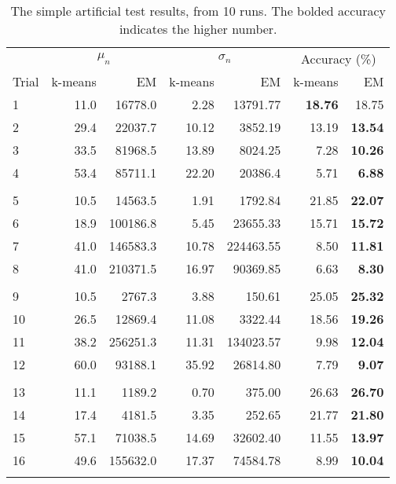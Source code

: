 \documentclass{journal}
\begin{document}
\begin{table}[hp]
\centering{}
\caption{The simple artificial test results, from 10 runs. The bolded
         accuracy indicates the higher number.}\label{tab:results}
\begin{tabular}{lrrrrrr}
    &
    \multicolumn{2}{c}{$\mu_n$} &
    \multicolumn{2}{c}{$\sigma_n$} &
    \multicolumn{2}{c}{Accuracy (\%)} \\
    \cmidrule(r){2-7}
    Trial & k-means & EM & k-means & EM & k-means & EM\\
    \midrule
    1 & 11.0 & 16778.0 & 2.28 & 13791.77 & \textbf{18.76} & 18.75 \\
    2 & 29.4 & 22037.7 & 10.12 & 3852.19 & 13.19 & \textbf{13.54}  \\
    3 & 33.5 & 81968.5 & 13.89 & 8024.25 & 7.28  & \textbf{10.26} \\
    4 & 53.4 & 85711.1 & 22.20 & 20386.4 & 5.71  & \textbf{6.88} \\ \\

    5 & 10.5 & 14563.5 & 1.91 & 1792.84 & 21.85 & \textbf{22.07}  \\
    6 & 18.9 & 100186.8 & 5.45 & 23655.33 & 15.71 & \textbf{15.72}  \\
    7 & 41.0 & 146583.3 & 10.78 & 224463.55 & 8.50  & \textbf{11.81} \\
    8 & 41.0 & 210371.5 & 16.97 & 90369.85 & 6.63  & \textbf{8.30} \\ \\

    9 & 10.5 & 2767.3 & 3.88 & 150.61 & 25.05 & \textbf{25.32}  \\
    10 & 26.5 & 12869.4 & 11.08 & 3322.44 & 18.56 & \textbf{19.26}  \\
    11 & 38.2 & 256251.3 & 11.31 & 134023.57 & 9.98  & \textbf{12.04} \\
    12 & 60.0 & 93188.1 & 35.92 & 26814.80 & 7.79  & \textbf{9.07} \\ \\

    13 & 11.1 & 1189.2 & 0.70 & 375.00 & 26.63 & \textbf{26.70}  \\
    14 & 17.4 & 4181.5 & 3.35 & 252.65 & 21.77 & \textbf{21.80}  \\
    15 & 57.1 & 71038.5 & 14.69 & 32602.40 & 11.55 & \textbf{13.97}  \\
    16 & 49.6 & 155632.0 & 17.37 & 74584.78 & 8.99  & \textbf{10.04} \\ \\


\end{tabular}
\end{table}
\end{document}
